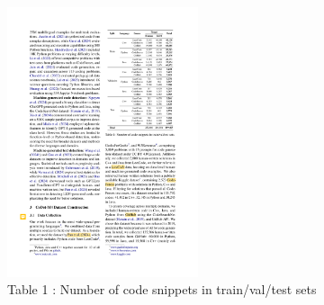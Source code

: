\begin{figure}[H]
    \centering
    \includegraphics[width=0.5\textwidth]{img/CoDet-M4/tab1.pdf} %
    \caption{Table 1 \cite{orel2025codet}: Number of code snippets in train/val/test sets}
    \label{fig:table1_CoDet-M4}
\end{figure}
